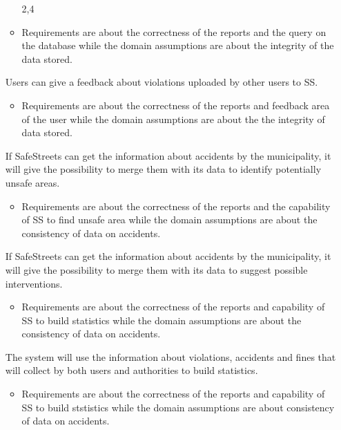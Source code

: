 \documentclass[../RASD.tex]{subfiles}
\begin{document}
\begin{enumerate}
\begin{itemize}
                        \assumption{} 2,4
                        \item Requirements are about the correctness of the reports and the query on the database while the domain assumptions are about the integrity of the data stored.
                    \end{itemize}
                     Users can give a feedback about violations uploaded by other users to SS.
                    \begin{itemize}
                        \requirement{} 1,2,3,4,5,6,7,8,23,22,24
                        \assumption{} 2,4
                        \item Requirements are about the correctness of the reports and feedback area of the user while the domain assumptions are about the the integrity of data stored.
                    \end{itemize}
                     If SafeStreets can get the information about accidents by the municipality, it will give the possibility to merge them with its data to identify potentially unsafe areas.
                    \begin{itemize}
                        \requirement{} 7,8,13,16,17,18,19,22,29
                        \assumption{} 3,5
                        \item Requirements are about the correctness of the reports and the capability of SS to find unsafe area while the domain assumptions are about the consistency of data on accidents.
                    \end{itemize}
                     If SafeStreets can get the information about accidents by the municipality, it will give the possibility to merge them with its data to suggest possible interventions.
                    \begin{itemize}
                        \requirement{} 5,6,7,8,17,18,19,20,22,25,29
                        \assumption{} 3,5
                        \item Requirements are about the correctness of the reports and capability of SS to build statistics while the domain assumptions are about the consistency of data on accidents.
                    \end{itemize}
                    \newpage
                     The system will use the information about violations, accidents and fines that will collect by both users and authorities to build statistics.
                    \begin{itemize}
                        \requirement{} 5,6,7,8,17,18,19,23,24,22,27,29
                        \assumption{} 2,5
                        \item Requirements are about the correctness of the reports and capability of SS to build ststistics while the domain assumptions are about consistency of data on accidents.
                    \end{itemize}\end{enumerate}
\end{document}

